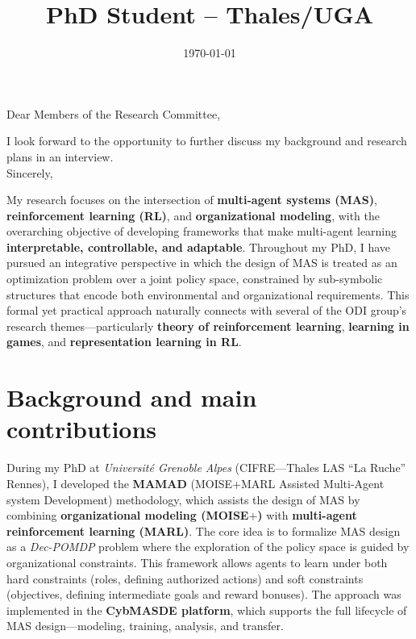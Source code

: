 \documentclass[11pt,a4paper,sans]{moderncv}
\title{PhD Student -- Thales/UGA}
\begin{document}
\date{\today}
\opening{Dear Members of the Research Committee,}
\closing{{I look forward to the opportunity to further discuss my background and research plans in an interview.}\\[0.6cm]Sincerely,\vspace{-0.6cm}}

\makelettertitle

\justifying

\noindent
My research focuses on the intersection of \textbf{multi-agent systems (MAS)}, \textbf{reinforcement learning (RL)}, and \textbf{organizational modeling}, with the overarching objective of developing frameworks that make multi-agent learning \textbf{interpretable, controllable, and adaptable}.
Throughout my PhD, I have pursued an integrative perspective in which the design of MAS is treated as an optimization problem over a joint policy space, constrained by sub-symbolic structures that encode both environmental and organizational requirements.
This formal yet practical approach naturally connects with several of the ODI group's research themes—particularly \textbf{theory of reinforcement learning}, \textbf{learning in games}, and \textbf{representation learning in RL}.

\section*{Background and main contributions}

During my PhD at \emph{Université Grenoble Alpes} (CIFRE—Thales LAS “La Ruche” Rennes), I developed the \textbf{MAMAD} (MOISE+MARL Assisted Multi-Agent system Development) methodology, which assists the design of MAS by combining \textbf{organizational modeling (MOISE$+$)} with \textbf{multi-agent reinforcement learning (MARL)}.
The core idea is to formalize MAS design as a \emph{Dec-POMDP} problem where the exploration of the policy space is guided by organizational constraints.
This framework allows agents to learn under both hard constraints (roles, defining authorized actions) and soft constraints (objectives, defining intermediate goals and reward bonuses).
The approach was implemented in the \textbf{CybMASDE platform}, which supports the full lifecycle of MAS design—modeling, training, analysis, and transfer.
\end{document}
